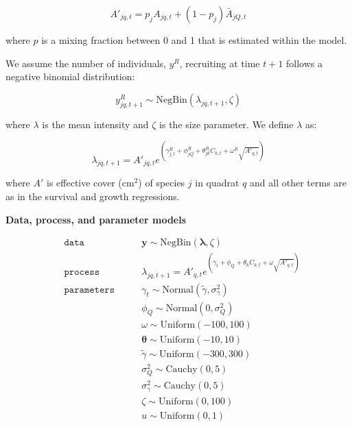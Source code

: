 \documentclass[12pt,]{article}
\begin{document}
\begin{equation}
A'_{jq,t} = p_{j}A_{jq,t} + (1-p_{j})\bar{A}_{jQ,t}
\end{equation}

where $p$ is a mixing fraction between 0 and 1 that is estimated within
the model.

We assume the number of individuals, $y^{R}$, recruiting at time $t+1$
follows a negative binomial distribution:

\begin{equation}
y^{R}_{jq,t+1} \sim \text{NegBin}(\lambda_{jq,t+1},\zeta)
\end{equation}

where $\lambda$ is the mean intensity and $\zeta$ is the size parameter.
We define $\lambda$ as:

\begin{equation}
\lambda_{jq,t+1} = A'_{jq,t}e^{(\gamma^{R}_{j,t} + \phi^{R}_{jQ} + \theta^{R}_{jk}C_{k,t} + \omega^{R}\sqrt{A'_{q,t}})}
\end{equation}

where $A'$ is effective cover ($\text{cm}^2$) of species $j$ in quadrat
$q$ and all other terms are as in the survival and growth regressions.

\textbf{Data, process, and parameter models}

\begin{align}
&\mathtt{data} \qquad &\textbf{y} \sim \text{NegBin}(\boldsymbol{\lambda},\zeta) \\
&\mathtt{process} \qquad &\lambda_{jq,t+1} = A'_{q,t}e^{(\gamma_{t} + \phi_{Q} + \theta_{k}C_{k,t} + \omega\sqrt{A'_{q,t}})} \\
&\mathtt{parameters} \qquad &\gamma_{t} \sim \text{Normal}(\tilde{\gamma}, \sigma_\gamma^2)\\
& \qquad & \phi_{Q} \sim \text{Normal}(0,\sigma_Q^2) \\
& \qquad & \omega \sim \text{Uniform}(-100, 100) \\
& \qquad & \boldsymbol{\theta} \sim \text{Uniform}(-10, 10) \\
& \qquad & \tilde{\gamma} \sim \text{Uniform}(-300, 300) \\
& \qquad & \sigma_Q^2 \sim \text{Cauchy}(0, 5) \\
& \qquad & \sigma_\gamma^2 \sim \text{Cauchy}(0, 5) \\
& \qquad & \zeta \sim \text{Uniform}(0, 100) \\
& \qquad & u \sim \text{Uniform}(0, 1)
\end{align}
\end{document}
